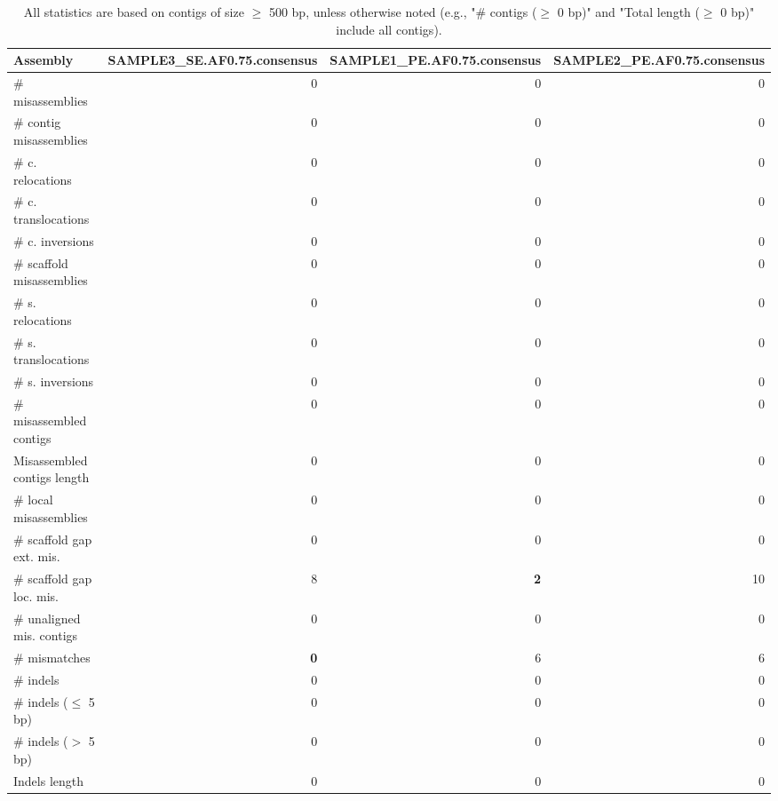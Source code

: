\documentclass[12pt,a4paper]{article}
\begin{document}
\begin{table}[ht]
\begin{center}
\caption{All statistics are based on contigs of size $\geq$ 500 bp, unless otherwise noted (e.g., "\# contigs ($\geq$ 0 bp)" and "Total length ($\geq$ 0 bp)" include all contigs).}
\begin{tabular}{|l*{3}{|r}|}
\hline
Assembly & SAMPLE3\_SE.AF0.75.consensus & SAMPLE1\_PE.AF0.75.consensus & SAMPLE2\_PE.AF0.75.consensus \\ \hline
\# misassemblies & 0 & 0 & 0 \\ \hline
\hspace{2mm}\# contig misassemblies & 0 & 0 & 0 \\ \hline
\hspace{5mm}\# c. relocations & 0 & 0 & 0 \\ \hline
\hspace{5mm}\# c. translocations & 0 & 0 & 0 \\ \hline
\hspace{5mm}\# c. inversions & 0 & 0 & 0 \\ \hline
\hspace{2mm}\# scaffold misassemblies & 0 & 0 & 0 \\ \hline
\hspace{5mm}\# s. relocations & 0 & 0 & 0 \\ \hline
\hspace{5mm}\# s. translocations & 0 & 0 & 0 \\ \hline
\hspace{5mm}\# s. inversions & 0 & 0 & 0 \\ \hline
\# misassembled contigs & 0 & 0 & 0 \\ \hline
Misassembled contigs length & 0 & 0 & 0 \\ \hline
\# local misassemblies & 0 & 0 & 0 \\ \hline
\# scaffold gap ext. mis. & 0 & 0 & 0 \\ \hline
\# scaffold gap loc. mis. & 8 & {\bf 2} & 10 \\ \hline
\# unaligned mis. contigs & 0 & 0 & 0 \\ \hline
\# mismatches & {\bf 0} & 6 & 6 \\ \hline
\# indels & 0 & 0 & 0 \\ \hline
\hspace{5mm}\# indels ($\leq$ 5 bp) & 0 & 0 & 0 \\ \hline
\hspace{5mm}\# indels ($>$ 5 bp) & 0 & 0 & 0 \\ \hline
Indels length & 0 & 0 & 0 \\ \hline
\end{tabular}
\end{center}
\end{table}
\end{document}
